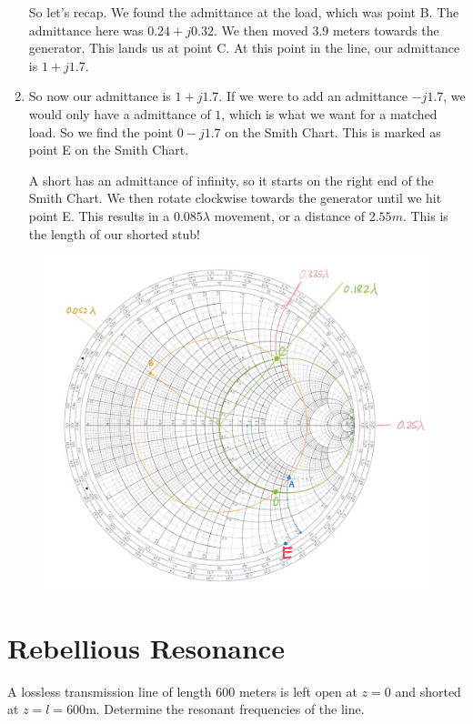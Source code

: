 \documentclass{article}
\begin{document}
\begin{enumerate}
    So let's recap. We found the admittance at the load, which was point B. The admittance here was $0.24 + j0.32$. We then moved 3.9 meters towards the generator. This lands us at point C. At this point in the line, our admittance is $1 + j1.7$. 

    \item So now our admittance is $1 + j1.7$. If we were to add an admittance $-j1.7$, we would only have a admittance of $1$, which is what we want for a matched load. So we find the point $0 - j1.7$ on the Smith Chart. This is marked as point E on the Smith Chart.

    A short has an admittance of infinity, so it starts on the right end of the Smith Chart. We then rotate clockwise towards the generator until we hit point E. This results in a $0.085\lambda$ movement, or a distance of $\boxed{2.55 m}$. This is the length of our shorted stub!
    
\end{enumerate}

\begin{figure}[H]
\begin{center}
    \includegraphics[width= 0.9
    \textwidth]{figures/Stubby Solution 2.jpg}
\end{center}
\end{figure}

\section{Rebellious Resonance}

A lossless transmission line of length 600 meters is left open at $z = 0$ and shorted at $z = l = 600$m. Determine the resonant frequencies of the line.
\end{document}
